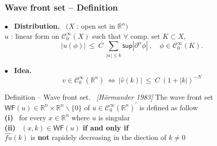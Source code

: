 \documentclass[9pt]{beamer}
\newcommand{\abs}[1]{\left|{#1}\right|} %
\renewcommand{\sup}{\mathsf{sup}} %
\newcommand{\WF}{\mathsf{WF}} %
\newcommand{\citebeam}[1]{\textit{\textcolor{black!60!white}{[#1]}}} %
\newcommand{\Ccal}{\mathcal{C}}
\newcommand{\Rbb}{\mathbb{R}}
\begin{document}
\begin{frame}

\frametitle{Wave front set -- Definition}

\vfill

$\bullet$ \ \textbf{Distribution.} \ $\big( X$ : open set in $\Rbb^n \big)$ \\
$u$ : linear form on $\Ccal^\infty_0(X)$ such that $\forall$ comp. set $K \subset X$,
\vspace*{-6pt}
\begin{equation*}
\abs{u(\phi)} \ \leq \ C \ \sum_{\abs{\alpha} \leq k} \sup\abs{\partial^\alpha \phi}   \ , \quad \phi \in \Ccal^\infty_0(K) .
\end{equation*}

\vfill

$\bullet$ \ \textbf{Idea.} 
\vspace*{-6pt}
\begin{equation*}
v \in \Ccal^\infty_0(\Rbb^n) \ \Leftrightarrow \ \abs{\hat{v}(k)} \ \leq \ C \ \left( 1 + \abs{k} \right)^{-N} 
\end{equation*}

\vfill

\begin{block}{Definition -- Wave front set. \ \citebeam{Hörmander 1983}}
 The wave front set $\WF(u) \in \Rbb^n \times \Rbb^n \backslash \{0\}$ of $u \in \Ccal^\infty_0(\Rbb^n)^\prime$ is defined as follow \\[2pt]
\qquad \textbf{(i)} \ for every $x \in \Rbb^n$ where $u$ is singular \\[2pt]
\qquad \textbf{(ii)} \ $(x,k) \in \WF(u)$ \textbf{if and only if} \\
\hspace*{32pt} $\hat{fu}(k)$ is \textbf{not} rapidely decreasing in the diection of $k \neq 0$ 
\end{block}

\vfill

\end{frame}
\end{document}
